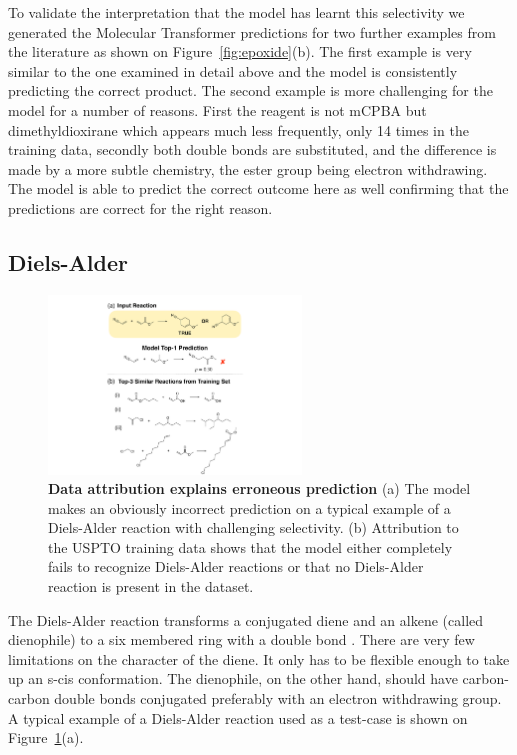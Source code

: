To validate the interpretation that the model has learnt this selectivity we generated the Molecular Transformer predictions for two further examples from the literature as shown on Figure~\ref{fig:epoxide}(b). The first example is very similar to the one examined in detail above and the model is consistently predicting the correct product. The second example is more challenging for the model for a number of reasons. First the reagent is not mCPBA but dimethyldioxirane which appears much less frequently, only 14 times in the training data, secondly both double bonds are substituted, and the difference is made by a more subtle chemistry, the ester group being electron withdrawing. The model is able to predict the correct outcome here as well confirming that the predictions are correct for the right reason. 

\subsection*{Diels-Alder}

\begin{figure}[ht!]
    \centering
    \includegraphics[width=0.6\textwidth]{Chapters/Transformer/Figs/diels_alder.pdf}
    \caption{\label{fig:diels_alder} \textbf{Data attribution explains erroneous prediction} (a) The model makes an obviously incorrect prediction on a typical example of a Diels-Alder reaction with challenging selectivity. (b) Attribution to the USPTO training data shows that the model either completely fails to recognize Diels-Alder reactions or that no Diels-Alder reaction is present in the dataset.}
\end{figure}

The Diels-Alder reaction transforms a conjugated diene and an alkene (called dienophile) to a six membered ring with a double bond \cite{Clayden2012}. There are very few limitations on the character of the diene. It only has to be flexible enough to take up an s-cis conformation. The dienophile, on the other hand, should have carbon-carbon double bonds conjugated preferably with an electron withdrawing group. A typical example of a Diels-Alder reaction used as a test-case is shown on Figure~\ref{fig:diels_alder}(a). 

